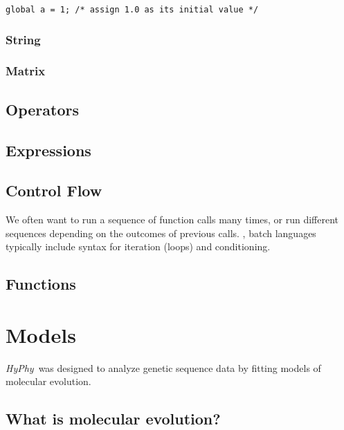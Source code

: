 \documentclass[12pt,twoside,openright]{book}
\newcommand{\hyphy}{\textit{HyPhy}}
\begin{document}
\begin{leftbar}
\begin{verbatim}
global a = 1; /* assign 1.0 as its initial value */
\end{verbatim}
\end{leftbar}





\subsection {String}



\subsection {Matrix}



\section {Operators}

\section {Expressions}

\section {Control Flow}




We often want to run a sequence of function calls many times, or run different sequences depending on the outcomes of previous calls.  , batch languages typically include syntax for iteration (loops) and conditioning. 


\section {Functions}





\chapter {Models}

\hyphy\ was designed to analyze genetic sequence data by fitting models of molecular evolution.  

\section {What is molecular evolution?}
\end{document}
